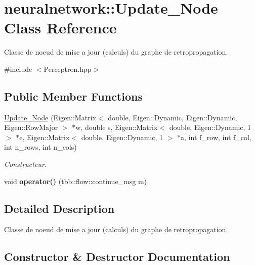 \hypertarget{classneuralnetwork_1_1_update___node}{}\section{neuralnetwork\+:\+:Update\+\_\+\+Node Class Reference}
\label{classneuralnetwork_1_1_update___node}


Classe de noeud de mise a jour (calculs) du graphe de retropropagation.  




{\ttfamily \#include $<$Perceptron.\+hpp$>$}

\subsection*{Public Member Functions}
\begin{DoxyCompactItemize}
\item 
\mbox{\hyperlink{classneuralnetwork_1_1_update___node_a047bb8357817785edafa3df3093aaa7d}{Update\+\_\+\+Node}} (Eigen\+::\+Matrix$<$ double, Eigen\+::\+Dynamic, Eigen\+::\+Dynamic, Eigen\+::\+Row\+Major $>$ $\ast$w, double s, Eigen\+::\+Matrix$<$ double, Eigen\+::\+Dynamic, 1 $>$ $\ast$e, Eigen\+::\+Matrix$<$ double, Eigen\+::\+Dynamic, 1 $>$ $\ast$a, int f\+\_\+row, int f\+\_\+col, int n\+\_\+rows, int n\+\_\+cols)
\begin{DoxyCompactList}\small\item\em Constructeur. \end{DoxyCompactList}\item 
\mbox{\label{classneuralnetwork_1_1_update___node_acb4569d976e35d17308d1faf8de84439}} 
void {\bfseries operator()} (tbb\+::flow\+::continue\+\_\+msg m)
\end{DoxyCompactItemize}


\subsection{Detailed Description}
Classe de noeud de mise a jour (calculs) du graphe de retropropagation. 

\subsection{Constructor \& Destructor Documentation}
\mbox{\label{classneuralnetwork_1_1_update___node_a047bb8357817785edafa3df3093aaa7d}} 

